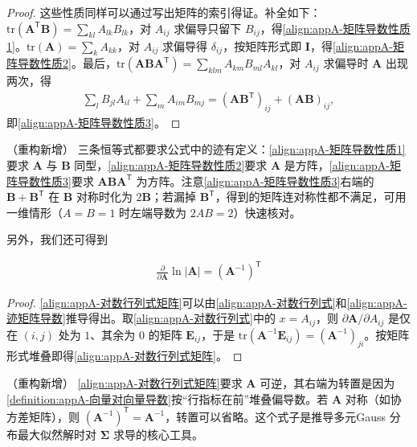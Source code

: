 \documentclass[../main.tex]{subfiles}
\begin{document}
\begin{proof}
这些性质同样可以通过写出矩阵的索引得证。补全如下：$\mathrm{tr}(\bm{A}^{\mathsf{T}}\bm{B})=\sum_{kl}A_{lk}B_{lk}$，对 $A_{ij}$ 求偏导只留下 $B_{ij}$，得\eqref{align:appA-矩阵导数性质1}。$\mathrm{tr}(\bm{A})=\sum_k A_{kk}$，对 $A_{ij}$ 求偏导得 $\delta_{ij}$，按矩阵形式即 $\bm{I}$，得\eqref{align:appA-矩阵导数性质2}。最后，$\mathrm{tr}(\bm{A}\bm{B}\bm{A}^{\mathsf{T}})=\sum_{klm}A_{km}B_{ml}A_{kl}$，对 $A_{ij}$ 求偏导时 $\bm{A}$ 出现两次，得
\begin{align*}
  \sum_{l}B_{jl}A_{il}+\sum_{m}A_{im}B_{mj}=(\bm{A}\bm{B}^{\mathsf{T}})_{ij}+(\bm{A}\bm{B})_{ij},
\end{align*}
即\eqref{align:appA-矩阵导数性质3}。
\end{proof}

\begin{remark}（重构新增）
三条恒等式都要求公式中的迹有定义：\eqref{align:appA-矩阵导数性质1}要求 $\bm{A}$ 与 $\bm{B}$ 同型，\eqref{align:appA-矩阵导数性质2}要求 $\bm{A}$ 是方阵，\eqref{align:appA-矩阵导数性质3}要求 $\bm{A}\bm{B}\bm{A}^{\mathsf{T}}$ 为方阵。注意\eqref{align:appA-矩阵导数性质3}右端的 $\bm{B}+\bm{B}^{\mathsf{T}}$ 在 $\bm{B}$ 对称时化为 $2\bm{B}$；若漏掉 $\bm{B}^{\mathsf{T}}$，得到的矩阵连对称性都不满足，可用一维情形（$A=B=1$ 时左端导数为 $2AB=2$）快速核对。
\end{remark}

另外，我们还可得到
\begin{proposition}[对数行列式关于矩阵的导数]\label{proposition:appA-对数行列式的矩阵导数}
\begin{align}
  \frac{\partial}{\partial\bm{A}}\ln|\bm{A}|=(\bm{A}^{-1})^{\mathsf{T}}
  \label{align:appA-对数行列式矩阵}
\end{align}
\end{proposition}

\begin{proof}
\eqref{align:appA-对数行列式矩阵}可以由\eqref{align:appA-对数行列式}和\eqref{align:appA-迹矩阵导数}推导得出。取\eqref{align:appA-对数行列式}中的 $x=A_{ij}$，则 $\partial\bm{A}/\partial A_{ij}$ 是仅在 $(i,j)$ 处为 $1$、其余为 $0$ 的矩阵 $\bm{E}_{ij}$，于是 $\mathrm{tr}(\bm{A}^{-1}\bm{E}_{ij})=(\bm{A}^{-1})_{ji}$。按矩阵形式堆叠即得\eqref{align:appA-对数行列式矩阵}。
\end{proof}

\begin{remark}（重构新增）
\eqref{align:appA-对数行列式矩阵}要求 $\bm{A}$ 可逆，其右端为转置是因为\cref{definition:appA-向量对向量导数}按“行指标在前”堆叠偏导数。若 $\bm{A}$ 对称（如协方差矩阵），则 $(\bm{A}^{-1})^{\mathsf{T}}=\bm{A}^{-1}$，转置可以省略。这个式子是推导多元Gauss 分布最大似然解时对 $\bm{\Sigma}$ 求导的核心工具。
\end{remark}
\end{document}
